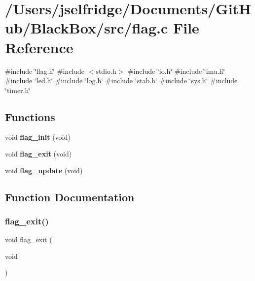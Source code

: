 \section{/\+Users/jselfridge/\+Documents/\+Git\+Hub/\+Black\+Box/src/flag.c File Reference}
\label{flag_8c}
{\ttfamily \#include \char`\"{}flag.\+h\char`\"{}}\newline
{\ttfamily \#include $<$stdio.\+h$>$}\newline
{\ttfamily \#include \char`\"{}io.\+h\char`\"{}}\newline
{\ttfamily \#include \char`\"{}imu.\+h\char`\"{}}\newline
{\ttfamily \#include \char`\"{}led.\+h\char`\"{}}\newline
{\ttfamily \#include \char`\"{}log.\+h\char`\"{}}\newline
{\ttfamily \#include \char`\"{}stab.\+h\char`\"{}}\newline
{\ttfamily \#include \char`\"{}sys.\+h\char`\"{}}\newline
{\ttfamily \#include \char`\"{}timer.\+h\char`\"{}}\newline
\subsection*{Functions}
\begin{DoxyCompactItemize}
\item 
void \textbf{ flag\+\_\+init} (void)
\item 
void \textbf{ flag\+\_\+exit} (void)
\item 
void \textbf{ flag\+\_\+update} (void)
\end{DoxyCompactItemize}


\subsection{Function Documentation}
\mbox{\label{flag_8c_a093f6ca0d3ecd0ff42a97d5584a17b16}} 
\subsubsection{flag\+\_\+exit()}
{\footnotesize\ttfamily void flag\+\_\+exit (\begin{DoxyParamCaption}\item[{void}]{ }\end{DoxyParamCaption})}

